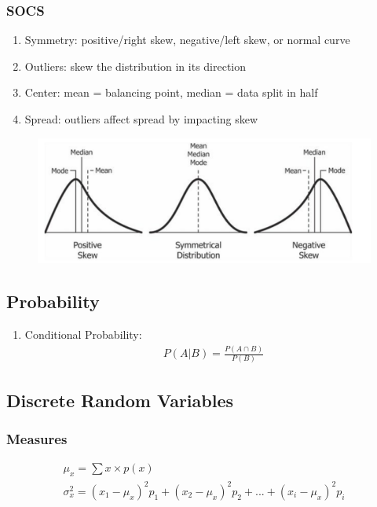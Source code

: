 \documentclass[12pt]{article}
\numberwithin{equation}{section}
\begin{document}
\subsubsection{SOCS}
\begin{enumerate}
    \item Symmetry: positive/right skew, negative/left skew, or normal curve
    \item Outliers: skew the distribution in its direction
    \item Center: mean = balancing point, median = data split in half
    \item Spread: outliers affect spread by impacting skew
\end{enumerate}
\begin{figure}[!ht]
    \centering
    \includegraphics[width=0.9\linewidth]{figures and tables/skew.png}
\end{figure}

\subsection{Probability}
\begin{enumerate}
    \item Conditional Probability:
    \begin{align}
        P(A|B) = \frac{P(A \cap B)}{P(B)}
    \end{align}
\end{enumerate}

\subsection{Discrete Random Variables}
\subsubsection{Measures}
\begin{gather}
    \mu_x = \sum x \times p(x) \\
    \sigma^2_x = (x_1-\mu_x)^2 p_1 + (x_2-\mu_x)^2 p_2 + ... + (x_i-\mu_x)^2 p_i
\end{gather}
\end{document}
